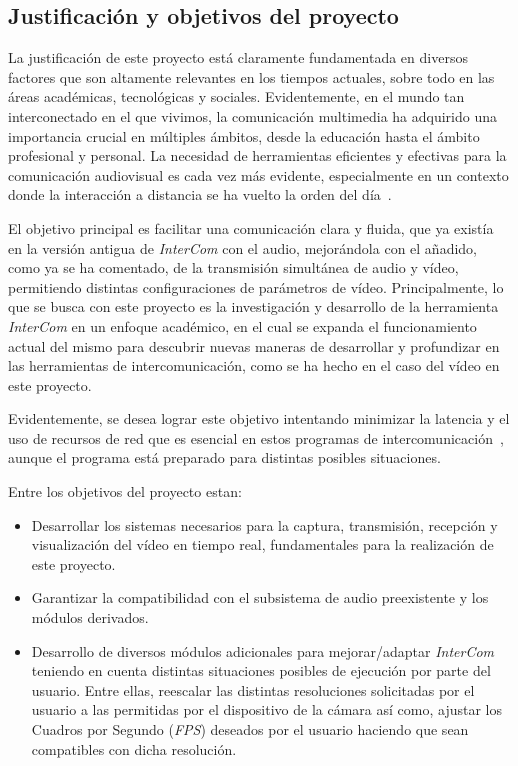 \subsection{Justificación y objetivos del proyecto}
La justificación de este proyecto está claramente fundamentada en diversos factores que son altamente relevantes en los tiempos actuales, sobre todo en las áreas académicas, tecnológicas y sociales. Evidentemente, en el mundo tan interconectado en el que vivimos, la comunicación multimedia ha adquirido una importancia crucial en múltiples ámbitos, desde la educación hasta el ámbito profesional y personal. La necesidad de herramientas eficientes y efectivas para la comunicación audiovisual es cada vez más evidente, especialmente en un contexto donde la interacción a distancia se ha vuelto la orden del día~\cite{GSMA}.
\vspace{\baselineskip}

El objetivo principal es facilitar una comunicación clara y fluida, que ya existía en la versión antigua de \textit{InterCom} con el audio, mejorándola con el añadido, como ya se ha comentado, de la transmisión simultánea de audio y vídeo, permitiendo distintas configuraciones de parámetros de vídeo. Principalmente, lo que se busca con este proyecto es la investigación y desarrollo de la herramienta \textit{InterCom} en un enfoque académico, en el cual se expanda el funcionamiento actual del mismo para descubrir nuevas maneras de desarrollar y profundizar en las herramientas de intercomunicación, como se ha hecho en el caso del vídeo en este proyecto.

\vspace{\baselineskip}
Evidentemente, se desea lograr este objetivo intentando minimizar la latencia y el uso de recursos de red que es esencial en estos programas de intercomunicación~\cite{cisco}, aunque el programa está preparado para distintas posibles situaciones.

\vspace{\baselineskip}

Entre los objetivos del proyecto estan:

\begin{itemize}
	\item Desarrollar los sistemas necesarios para la captura, transmisión, recepción y visualización del vídeo en tiempo real, fundamentales para la realización de este proyecto.
	\item Garantizar la compatibilidad con el subsistema de audio preexistente y los módulos derivados.
	\item Desarrollo de diversos módulos adicionales para mejorar/adaptar \textit{InterCom} teniendo en cuenta distintas situaciones posibles de ejecución por parte del usuario. Entre ellas, reescalar las distintas resoluciones solicitadas por el usuario a las permitidas por el dispositivo de la cámara así como, ajustar los Cuadros por Segundo (\textit{FPS}) deseados por el usuario haciendo que sean compatibles con dicha resolución.
\end{itemize}
\vspace{\baselineskip}


